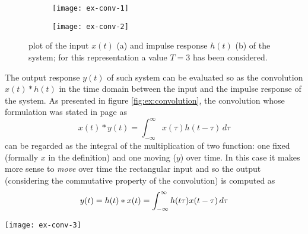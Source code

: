 		\begin{figure}[bt]
			\centering 
			\begin{subfigure}{0.48\linewidth}
				\centering \texttt{[image: ex-conv-1]} \caption{}
			\end{subfigure}
			\begin{subfigure}{0.48\linewidth}
				\centering \texttt{[image: ex-conv-2]} \caption{}
			\end{subfigure}
			\caption{plot of the input $x(t)$ (a) and impulse response $h(t)$ (b) of the system; for this representation a value $T=3$ has been considered.} \label{fig:ex:signals}
		\end{figure}
		
		The output response $y(t)$ of such system can be evaluated so as the convolution $x(t)*h(t)$ in the time domain between the input and the impulse response of the system. As presented in figure \ref{fig:ex:convolution}, the convolution whose formulation was stated in page \pageref{eq:four:convolution} as
		\[ x(t) * y(t) = \int_{-\infty}^\infty x(\tau) h(t-\tau)\, d\tau \]
		can be regarded as the integral of the multiplication of two function: one fixed (formally $x$ in the definition) and one moving ($y$) over time. In this case it makes more sense to \textit{move} over time the rectangular input and so the output (considering the commutative property of the convolution) is computed as
		\[ y(t) = h(t) * x(t) = \int_{-\infty}^\infty h(t\tau)x(t-\tau)\, d\tau \]
		
		\begin{SCfigure}[2][bht]
			\centering \texttt{[image: ex-conv-3]} 
			\caption{the convolution can be computed considering a fixed signal (in this case $h(t)$ in orange) and a moving one ($x(t)$); the value of the convolution is the integral of the product for each position $\tau$ of the moving function. } \label{fig:ex:convolution}
		\end{SCfigure}
	
